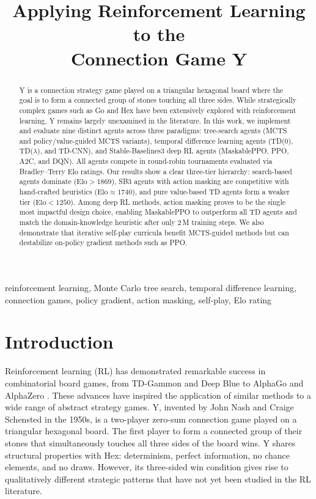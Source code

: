 \documentclass[conference]{IEEEtran}
\title{Applying Reinforcement Learning to the\\Connection Game Y}
\author{
  \IEEEauthorblockN{Advait Shinde\IEEEauthorrefmark{1},
                    Jasper Morgal\IEEEauthorrefmark{2},
                    Nickzad Bayati\IEEEauthorrefmark{3},
                    Toney Zhen\IEEEauthorrefmark{4}}
  \IEEEauthorblockA{Department of Computer Engineering\\
    San José State University, San José, CA\\
    \{advait.shinde, jasper.morgal, nickzad.bayati, toney.zhen\}@sjsu.edu}
    }
\begin{document}
\maketitle

\begin{abstract}
Y is a connection strategy game played on a triangular hexagonal board where the
goal is to form a connected group of stones touching all three sides. While
strategically complex games such as Go and Hex have been extensively explored with
reinforcement learning, Y remains largely unexamined in the literature. In this
work, we implement and evaluate nine distinct agents across three paradigms:
tree-search agents (MCTS and policy/value-guided MCTS variants), temporal
difference learning agents (TD(0), TD($\lambda$), and TD-CNN), and
Stable-Baselines3 deep RL agents (MaskablePPO, PPO, A2C, and DQN). All agents
compete in round-robin tournaments evaluated via Bradley--Terry Elo ratings.
Our results show a clear three-tier hierarchy: search-based agents dominate
($\text{Elo} > 1869$), SB3 agents with action masking are competitive with
hand-crafted heuristics ($\text{Elo} \approx 1740$), and pure value-based
TD agents form a weaker tier ($\text{Elo} < 1250$). Among deep RL methods,
action masking proves to be the single most impactful design choice, enabling
MaskablePPO to outperform all TD agents and match the domain-knowledge
heuristic after only 2\,M training steps. We also demonstrate that iterative
self-play curricula benefit MCTS-guided methods but can destabilize on-policy
gradient methods such as PPO.
\end{abstract}

\begin{IEEEkeywords}
reinforcement learning, Monte Carlo tree search, temporal difference learning,
connection games, policy gradient, action masking, self-play, Elo rating
\end{IEEEkeywords}

\section{Introduction}

Reinforcement learning (RL) has demonstrated remarkable success in combinatorial
board games, from TD-Gammon \cite{tesauro1995} and Deep Blue
\cite{campbell2002} to AlphaGo \cite{silver2016} and AlphaZero
\cite{silver2017}. These advances have inspired the application of similar
methods to a wide range of abstract strategy games. Y, invented by John Nash and
Craige Schensted in the 1950s, is a two-player zero-sum connection game played on
a triangular hexagonal board. The first player to form a connected group of their
stones that simultaneously touches all three sides of the board wins. Y shares
structural properties with Hex: determinism, perfect information, no chance
elements, and no draws. However, its three-sided win condition gives rise to
qualitatively different strategic patterns that have not yet been studied in the
RL literature.
\end{document}
